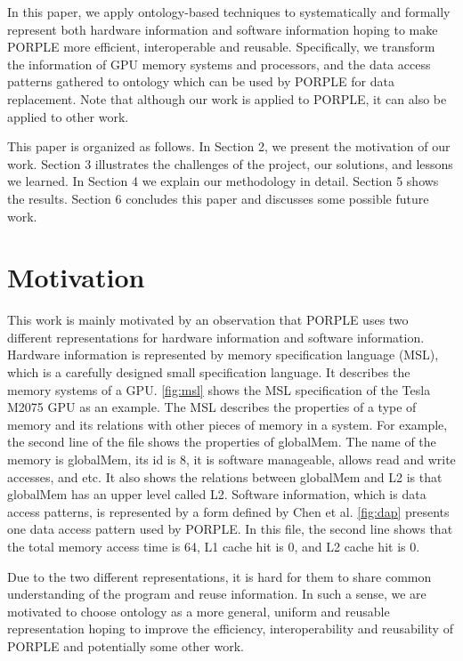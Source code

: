 \documentclass{sig-alternate}
\begin{document}
In this paper, we apply ontology-based techniques to systematically and formally represent both hardware information and software information hoping to make PORPLE more efficient, interoperable and reusable. Specifically, we transform the information of GPU memory systems and processors, and the data access patterns gathered to ontology which can be used by PORPLE for data replacement. Note that although our work is applied to PORPLE, it can also be applied to other work.

This paper is organized as follows. In Section 2, we present the motivation of our work. Section 3 illustrates the challenges of the project, our solutions, and lessons we learned. In Section 4 we explain our methodology in detail. Section 5 shows the results. Section 6 concludes this paper and discusses some possible future work.

\section{Motivation}
This work is mainly motivated by an observation that PORPLE uses two different representations for hardware information and software information. Hardware information is represented by memory specification language (MSL), which is a carefully designed small specification language. It describes the memory systems of a GPU. \ref{fig:msl} shows the MSL specification of the Tesla M2075 GPU as an example. The MSL describes the properties of a type of memory and its relations with other pieces of memory in a system. For example, the second line of the file shows the properties of globalMem. The name of the memory is globalMem, its id is 8, it is software manageable, allows read and write accesses, and etc. It also shows the relations between globalMem and L2 is that globalMem has an upper level called L2. Software information, which is data access patterns, is represented by a form defined by Chen et al. \cite{porple} \ref{fig:dap} presents one data access pattern used by PORPLE. In this file, the second line shows that the total memory access time is 64, L1 cache hit is 0, and L2 cache hit is 0.

Due to the two different representations, it is hard for them to share common understanding of the program and reuse information. In such a sense, we are motivated to choose ontology as a more general, uniform and reusable representation hoping to improve the efficiency, interoperability and reusability of PORPLE and potentially some other work.
\end{document}
